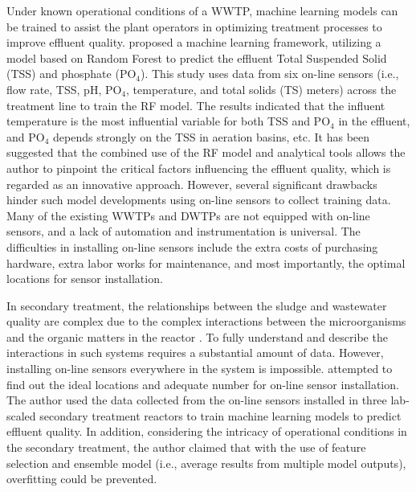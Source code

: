 Under known operational conditions of a WWTP, machine learning models can be trained to assist the plant operators in optimizing treatment processes to improve effluent quality. \citet{wangMachineLearningFramework2021} proposed a machine learning framework, utilizing a model based on Random Forest to predict the effluent Total Suspended Solid (TSS) and phosphate (PO$_4$). This study uses data from six on-line sensors (i.e., flow rate, TSS, pH, PO$_4$, temperature, and total solids (TS) meters) across the treatment line to train the RF model. The results indicated that the influent temperature is the most influential variable for both TSS and PO$_4$ in the effluent, and PO$_4$ depends strongly on the TSS in aeration basins, etc. It has been suggested that the combined use of the RF model and analytical tools allows the author to pinpoint the critical factors influencing the effluent quality, which is regarded as an innovative approach. However, several significant drawbacks hinder such model developments using on-line sensors to collect training data. Many of the existing WWTPs and DWTPs are not equipped with on-line sensors, and a lack of automation and instrumentation is universal. The difficulties in installing on-line sensors include the extra costs of purchasing hardware, extra labor works for maintenance, and most importantly, the optimal locations for sensor installation. 

In secondary treatment, the relationships between the sludge and wastewater quality are complex due to the complex interactions between the microorganisms and the organic matters in the reactor  \citep{wilenMechanismsGranulationActivated2018}. To fully understand and describe the interactions in such systems requires a substantial amount of data. However, installing on-line sensors everywhere in the system is impossible. \citet{zaghloulDevelopmentEnsembleMachine2021} attempted to find out the ideal locations and adequate number for on-line sensor installation. The author used the data collected from the on-line sensors installed in three lab-scaled secondary treatment reactors to train machine learning models to predict effluent quality. In addition, considering the intricacy of operational conditions in the secondary treatment, the author claimed that with the use of feature selection and ensemble model (i.e., average results from multiple model outputs), overfitting could be prevented. 


